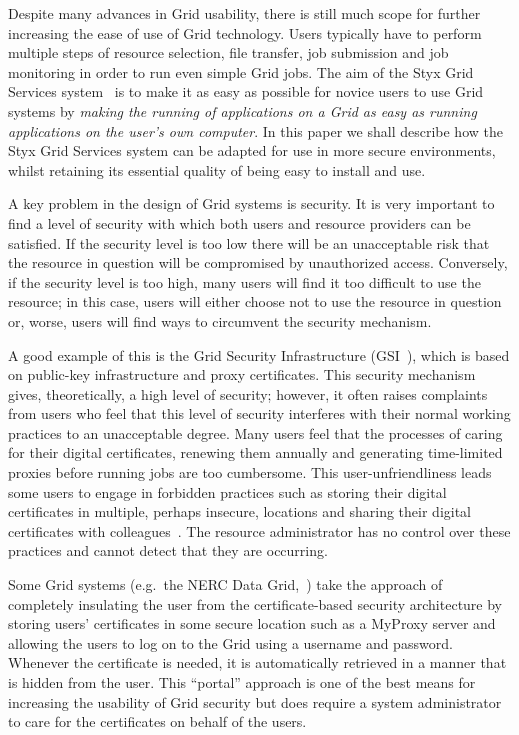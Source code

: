 \documentclass[times,10pt,twocolumn]{article}
\begin{document}
Despite many advances in Grid usability, there is still much scope for further increasing the ease of use of Grid technology.  Users typically have to perform multiple steps of resource selection, file transfer, job submission and job monitoring in order to run even simple Grid jobs.  The aim of the Styx Grid Services system~\cite{blower:2006} is to make it as easy as possible for novice users to use Grid systems by {\em making the running of applications on a Grid as easy as running applications on the user's own computer\/}.  In this paper we shall describe how the Styx Grid Services system can be adapted for use in more secure environments, whilst retaining its essential quality of being easy to install and use.

A key problem in the design of Grid systems is security.  It is very important to find a level of security with which both users and resource providers can be satisfied.  If the security level is too low there will be an unacceptable risk that the resource in question will be compromised by unauthorized access.  Conversely, if the security level is too high, many users will find it too difficult to use the resource; in this case, users will either choose not to use the resource in question or, worse, users will find ways to circumvent the security mechanism.

A good example of this is the Grid Security Infrastructure (GSI~\cite{gsi}), which is based on public-key infrastructure and proxy certificates.  This security mechanism gives, theoretically, a high level of security; however, it often raises complaints from users who feel that this level of security interferes with their normal working practices to an unacceptable degree.  Many users feel that the processes of caring for their digital certificates, renewing them annually and generating time-limited proxies before running jobs are too cumbersome.  This user-unfriendliness leads some users to engage in forbidden practices such as storing their digital certificates in multiple, perhaps insecure, locations and sharing their digital certificates with colleagues~\cite{beckles:2005}.  The resource administrator has no control over these practices and cannot detect that they are occurring.

Some Grid systems (e.g.\ the NERC Data Grid,~\cite{ndg}) take the approach of completely insulating the user from the certificate-based security architecture by storing users' certificates in some secure location such as a MyProxy server and allowing the users to log on to the Grid using a username and password.  Whenever the certificate is needed, it is automatically retrieved in a manner that is hidden from the user.  This ``portal'' approach is one of the best means for increasing the usability of Grid security but does require a system administrator to care for the certificates on behalf of the users.
\end{document}
